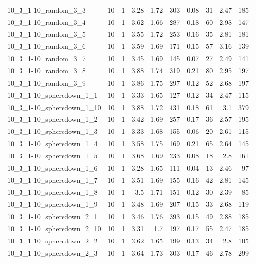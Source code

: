 \begin{center}
\begin{scriptsize}
\begin{longtable}{lrrrrrrrrr}
10\_3\_1-10\_random\_3\_3 & 10 & 1 & 3.28 & 1.72 & 303 & 0.08 & 31 & 2.47 & 185\\
10\_3\_1-10\_random\_3\_4 & 10 & 1 & 3.62 & 1.66 & 287 & 0.18 & 60 & 2.98 & 147\\
10\_3\_1-10\_random\_3\_5 & 10 & 1 & 3.55 & 1.72 & 253 & 0.16 & 35 & 2.81 & 181\\
10\_3\_1-10\_random\_3\_6 & 10 & 1 & 3.59 & 1.69 & 171 & 0.15 & 57 & 3.16 & 139\\
10\_3\_1-10\_random\_3\_7 & 10 & 1 & 3.45 & 1.69 & 145 & 0.07 & 27 & 2.49 & 141\\
10\_3\_1-10\_random\_3\_8 & 10 & 1 & 3.88 & 1.74 & 319 & 0.21 & 80 & 2.95 & 197\\
10\_3\_1-10\_random\_3\_9 & 10 & 1 & 3.86 & 1.75 & 297 & 0.12 & 52 & 2.68 & 197\\
10\_3\_1-10\_spheredown\_1\_1 & 10 & 1 & 3.33 & 1.65 & 127 & 0.12 & 34 & 2.47 & 115\\
10\_3\_1-10\_spheredown\_1\_10 & 10 & 1 & 3.88 & 1.72 & 431 & 0.18 & 61 & 3.1 & 379\\
10\_3\_1-10\_spheredown\_1\_2 & 10 & 1 & 3.42 & 1.69 & 257 & 0.17 & 36 & 2.57 & 195\\
10\_3\_1-10\_spheredown\_1\_3 & 10 & 1 & 3.33 & 1.68 & 155 & 0.06 & 20 & 2.61 & 115\\
10\_3\_1-10\_spheredown\_1\_4 & 10 & 1 & 3.58 & 1.75 & 169 & 0.21 & 65 & 2.64 & 145\\
10\_3\_1-10\_spheredown\_1\_5 & 10 & 1 & 3.68 & 1.69 & 233 & 0.08 & 18 & 2.8 & 161\\
10\_3\_1-10\_spheredown\_1\_6 & 10 & 1 & 3.28 & 1.65 & 111 & 0.04 & 13 & 2.46 & 97\\
10\_3\_1-10\_spheredown\_1\_7 & 10 & 1 & 3.51 & 1.69 & 155 & 0.16 & 42 & 2.81 & 145\\
10\_3\_1-10\_spheredown\_1\_8 & 10 & 1 & 3.5 & 1.71 & 151 & 0.12 & 30 & 2.39 & 85\\
10\_3\_1-10\_spheredown\_1\_9 & 10 & 1 & 3.48 & 1.69 & 207 & 0.15 & 33 & 2.68 & 119\\
10\_3\_1-10\_spheredown\_2\_1 & 10 & 1 & 3.46 & 1.76 & 393 & 0.15 & 49 & 2.88 & 185\\
10\_3\_1-10\_spheredown\_2\_10 & 10 & 1 & 3.31 & 1.7 & 197 & 0.17 & 55 & 2.47 & 185\\
10\_3\_1-10\_spheredown\_2\_2 & 10 & 1 & 3.62 & 1.65 & 199 & 0.13 & 34 & 2.8 & 105\\
10\_3\_1-10\_spheredown\_2\_3 & 10 & 1 & 3.64 & 1.73 & 303 & 0.17 & 46 & 2.78 & 299\\

\end{longtable}
\end{scriptsize}
\end{center}
